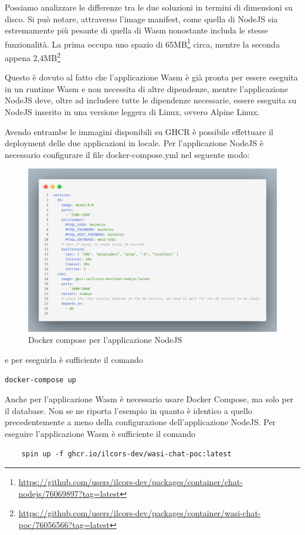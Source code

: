 Possiamo analizzare le differenze tra le due soluzioni in termini di dimensioni su disco. Si può notare, attraverso
l'image manifest, come quella di NodeJS sia estremamente più pesante di quella di Wasm nonostante includa le stesse
funzionalità. La prima occupa uno spazio di
65MB\footnote{\url{https://github.com/users/ilcors-dev/packages/container/chat-nodejs/76069897?tag=latest}} circa,
mentre la seconda appena
2,4MB\footnote{\url{https://github.com/users/ilcors-dev/packages/container/wasi-chat-poc/76056566?tag=latest}}

Questo è dovuto al fatto che l'applicazione Wasm è già pronta per essere eseguita in un runtime Wasm e non necessita di
altre dipendenze, mentre l'applicazione NodeJS deve, oltre ad includere tutte le dipendenze necessarie, essere eseguita
su NodeJS inserito in una versione leggera di Linux, ovvero Alpine Linux.

Avendo entrambe le immagini disponibili su GHCR è possibile effettuare il deployment delle due applicazioni in locale.
Per l'applicazione NodeJS è necessario configurare il file docker-compose.yml nel seguente modo:

\begin{figure}[!htb]
    \includegraphics[width=\linewidth]{chapters/3.poc/images/5.docker-compose-nodejs.png}
    \caption{Docker compose per l'applicazione NodeJS}\label{fig:nodejs-dockercompose}
\end{figure}

e per eseguirla è sufficiente il comando

\begin{verbatim}
docker-compose up
\end{verbatim}

Anche per l'applicazione Wasm è necessario usare Docker Compose, ma solo per il database. Non se ne riporta l'esempio in
quanto è identico a quello precedentemente a meno della configurazione dell'applicazione NodeJS. Per eseguire
l'applicazione Wasm è sufficiente il comando
\begin{verbatim}
    spin up -f ghcr.io/ilcors-dev/wasi-chat-poc:latest
\end{verbatim}

